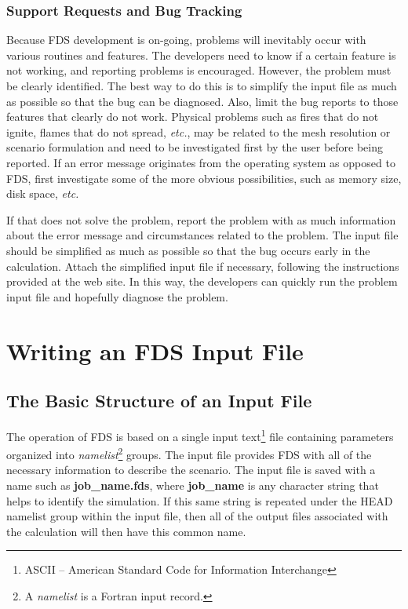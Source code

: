 \documentclass[11pt]{book}
\begin{document}
\section{Support Requests and Bug Tracking}%

Because FDS development is on-going, problems will inevitably occur
with various routines and features. The developers need to know if a certain
feature is not working, and reporting problems is encouraged. However, the
problem must be clearly identified. The best way to do this is to simplify
the input file as much as possible so that the bug can be diagnosed.
Also, limit the bug reports to those features that clearly do not work.
Physical problems such as fires that do not ignite, flames that do not
spread, {\em etc.}, may be related to the mesh resolution or scenario
formulation and need to be investigated first by the user before being
reported. If an error message originates from the operating system as
opposed to FDS, first investigate some of the more obvious possibilities,
such as memory size, disk space, {\em etc.}

If that does not solve the problem, report the problem with as much information about the error message and
circumstances related to the problem. The input file should be simplified
as much as possible so that the bug occurs early in the calculation.
Attach the simplified input file if necessary, following the instructions provided at the web site.  In this way, the developers can
quickly run the problem input file and hopefully diagnose the problem.





\part{Writing an FDS Input File}
\label{info:inputfilecreation}



\chapter{The Basic Structure of an Input File}
\label{info:fdsBasic}

The operation of FDS is based on a single input text\footnote{ASCII -- American Standard Code for Information Interchange} file containing parameters organized into
{\em namelist}\footnote{A {\em namelist} is a Fortran input record.} groups.
The input file provides FDS  with all of the necessary information to
describe the scenario.
The input file is saved with a name such as {\bf job\_name.fds},
where {\bf job\_name} is any character string that helps to identify
the simulation. If this same string is repeated under the {\ct HEAD} namelist group within the input file, then all of the
output files associated with the calculation will then have this common name.
\end{document}
